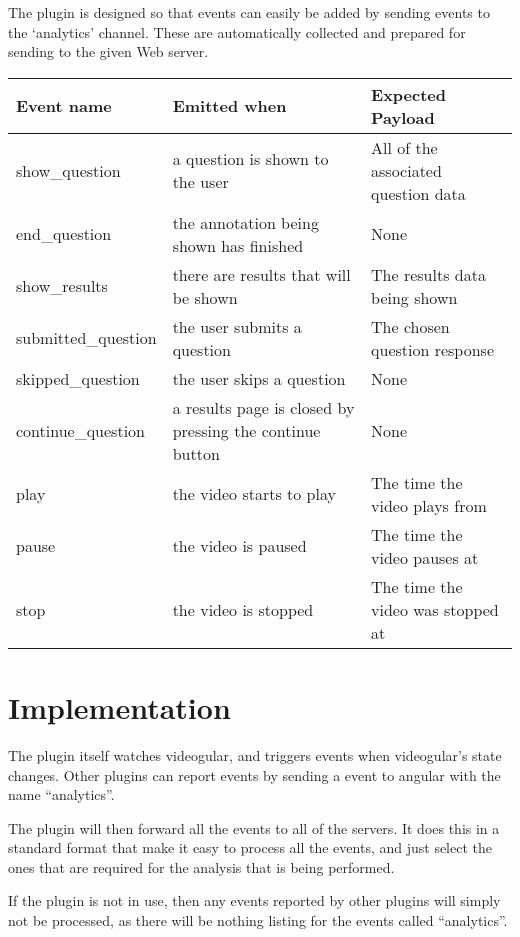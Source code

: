 The plugin is designed so that events can easily be added by sending events to the `analytics' channel. These are automatically collected and prepared for sending to the given Web server.

\begin{tabular}{p{3.2cm} p{6cm} p{4cm}}

\textbf{Event name} & \textbf{Emitted when} & \textbf{Expected Payload} \\
\hline
show\_question & a question is shown to the user & All of the associated question data \\
\hline
end\_question & the annotation being shown has finished & None \\
\hline
show\_results & there are results that will be shown & The results data being shown \\
\hline
submitted\_question & the user submits a question & The chosen question response \\
\hline
skipped\_question & the user skips a question & None \\
\hline
continue\_question & a results page is closed by pressing the continue button & None \\
\hline
play & the video starts to play & The time the video plays from \\
\hline
pause & the video is paused & The time the video pauses at \\
\hline
stop & the video is stopped & The time the video was stopped at \\
\end{tabular}

\section{Implementation}

The plugin itself watches videogular, and triggers events when videogular's state changes. Other plugins can report events by sending a event to angular with the name ``analytics''.

The plugin will then forward all the events to all of the servers. It does this in a standard format that make it easy to process all the events, and just select the ones that are required for the analysis that is being performed.

If the plugin is not in use, then any events reported by other plugins will simply not be processed, as there will be nothing listing for the events called ``analytics''.

